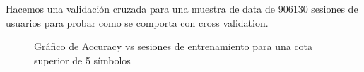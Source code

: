 	Hacemos una validación cruzada para una muestra de data de 906130 sesiones de usuarios para probar como se comporta con {cross validation}.
	
	
	
	\begin{figure}[h] 
		\centering
		\caption{Gráfico de Accuracy vs sesiones de entrenamiento para una cota superior de 5 símbolos}
		\label{fig:sim}
	\end{figure}